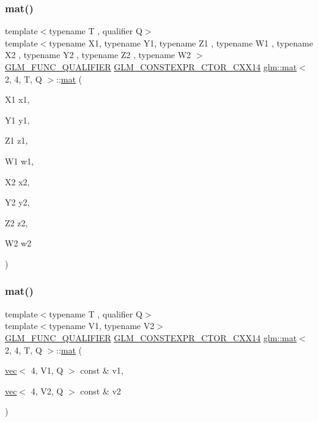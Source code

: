 \subsubsection{\texorpdfstring{mat()}{mat()}\hspace{0.1cm}{\footnotesize\ttfamily [19/21]}}
{\footnotesize\ttfamily template$<$typename T , qualifier Q$>$ \\
template$<$typename X1, typename Y1, typename Z1 , typename W1 , typename X2 , typename Y2 , typename Z2 , typename W2 $>$ \\
\mbox{\hyperlink{setup_8hpp_a33fdea6f91c5f834105f7415e2a64407}{G\+L\+M\+\_\+\+F\+U\+N\+C\+\_\+\+Q\+U\+A\+L\+I\+F\+I\+ER}} \mbox{\hyperlink{setup_8hpp_a0900f9145e68bf6061b6f5e7be3fa751}{G\+L\+M\+\_\+\+C\+O\+N\+S\+T\+E\+X\+P\+R\+\_\+\+C\+T\+O\+R\+\_\+\+C\+X\+X14}} \mbox{\hyperlink{structglm_1_1mat}{glm\+::mat}}$<$ 2, 4, T, Q $>$\+::\mbox{\hyperlink{structglm_1_1mat}{mat}} (\begin{DoxyParamCaption}\item[{X1}]{x1,  }\item[{Y1}]{y1,  }\item[{Z1}]{z1,  }\item[{W1}]{w1,  }\item[{X2}]{x2,  }\item[{Y2}]{y2,  }\item[{Z2}]{z2,  }\item[{W2}]{w2 }\end{DoxyParamCaption})}

\mbox{\label{structglm_1_1mat_3_012_00_014_00_01_t_00_01_q_01_4_a727b28490a4fbcaa1cf57cc335d1205d}} 
\subsubsection{\texorpdfstring{mat()}{mat()}\hspace{0.1cm}{\footnotesize\ttfamily [20/21]}}
{\footnotesize\ttfamily template$<$typename T , qualifier Q$>$ \\
template$<$typename V1, typename V2$>$ \\
\mbox{\hyperlink{setup_8hpp_a33fdea6f91c5f834105f7415e2a64407}{G\+L\+M\+\_\+\+F\+U\+N\+C\+\_\+\+Q\+U\+A\+L\+I\+F\+I\+ER}} \mbox{\hyperlink{setup_8hpp_a0900f9145e68bf6061b6f5e7be3fa751}{G\+L\+M\+\_\+\+C\+O\+N\+S\+T\+E\+X\+P\+R\+\_\+\+C\+T\+O\+R\+\_\+\+C\+X\+X14}} \mbox{\hyperlink{structglm_1_1mat}{glm\+::mat}}$<$ 2, 4, T, Q $>$\+::\mbox{\hyperlink{structglm_1_1mat}{mat}} (\begin{DoxyParamCaption}\item[{\mbox{\hyperlink{structglm_1_1vec}{vec}}$<$ 4, V1, Q $>$ const \&}]{v1,  }\item[{\mbox{\hyperlink{structglm_1_1vec}{vec}}$<$ 4, V2, Q $>$ const \&}]{v2 }\end{DoxyParamCaption})}

